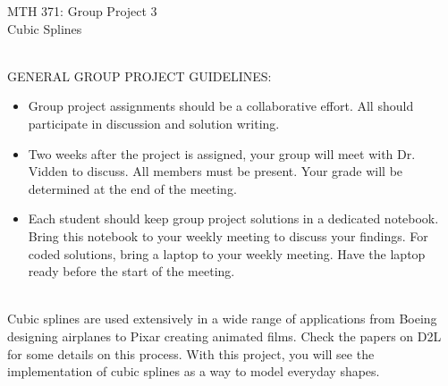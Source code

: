 \documentclass[addpoints, 11pt]{exam}
\begin{document}
\vspace{100mm}
\begin{center} \Large
MTH 371: Group Project 3 \\ Cubic Splines \normalsize
\end{center}
\ \\
\noindent GENERAL GROUP PROJECT GUIDELINES: 
\begin{itemize}
\item Group project assignments should be a collaborative effort. All should participate in discussion and solution writing. \vspace{-2mm}
\item Two weeks after the project is assigned, your group will meet with Dr. Vidden to discuss. All members must be present. Your grade will be determined at the end of the meeting. \vspace{-2mm}
\item Each student should keep group project solutions in a dedicated notebook. Bring this notebook to your weekly meeting to discuss your findings. For coded solutions, bring a laptop to your weekly meeting. Have the laptop ready before the start of the meeting. \vspace{-2mm}
\end{itemize}
\ \\

Cubic splines are used extensively in a wide range of applications from Boeing designing airplanes to Pixar creating animated films. Check the papers on D2L for some details on this process. With this project, you will see the implementation of cubic splines as a way to model everyday shapes.
\end{document}
